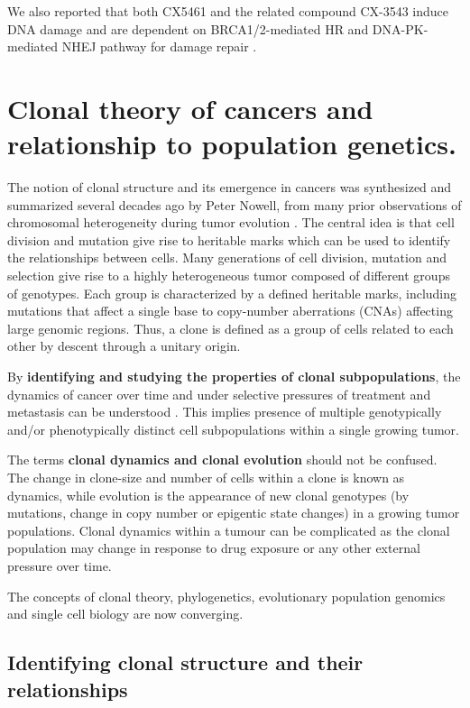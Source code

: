 We also reported that both CX5461 and the related compound CX-3543 induce DNA damage and are dependent on BRCA1/2-mediated HR and DNA-PK-mediated NHEJ pathway for damage repair \cite{xu2017cx}.


\section{Clonal theory of cancers and relationship to population genetics.}
The notion of clonal structure and its emergence in cancers was synthesized and summarized several decades ago by Peter Nowell, from many prior observations of chromosomal heterogeneity during tumor evolution \cite{nowell1976clonal}. The central idea is that cell division and mutation give rise to heritable marks which can be used to identify the relationships between cells. Many generations of cell division, mutation and selection give rise to a highly heterogeneous tumor composed of different groups of genotypes. Each group is characterized by a defined heritable marks, including mutations that affect a single base to copy-number aberrations (CNAs) affecting large genomic regions. Thus, a clone is defined as a group of cells related to each other by descent through a unitary origin. 

By \textbf{identifying and studying the properties of clonal subpopulations}, the dynamics of cancer over time and under selective pressures of treatment and metastasis can be understood \cite{aparicio2013implications}. This implies presence of multiple genotypically and/or phenotypically distinct cell subpopulations within a single growing tumor.

The terms \textbf{clonal dynamics and clonal evolution} should not be confused. The change in clone-size and number of cells within a clone is known as dynamics, while evolution is the appearance of new clonal genotypes (by mutations, change in copy number or epigentic state changes) in a growing tumor populations. 
Clonal dynamics within a tumour can be complicated as the clonal population may change in response to drug exposure or any other external pressure over time.

The concepts of clonal theory, phylogenetics, evolutionary population genomics and single cell biology are now converging.


\subsection{Identifying clonal structure and their relationships}


